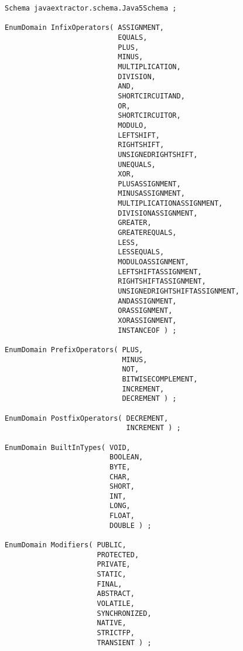 \begin{lstlisting}[caption=Das im Javaextraktor eingesetzte Schema, label=schema_complete, captionpos=b, style=tgschema]
Schema javaextractor.schema.Java5Schema ;

EnumDomain InfixOperators( ASSIGNMENT,
                           EQUALS,
                           PLUS,
                           MINUS,
                           MULTIPLICATION,
                           DIVISION,
                           AND,
                           SHORTCIRCUITAND,
                           OR,
                           SHORTCIRCUITOR,
                           MODULO,
                           LEFTSHIFT,
                           RIGHTSHIFT,
                           UNSIGNEDRIGHTSHIFT,
                           UNEQUALS,
                           XOR,
                           PLUSASSIGNMENT,
                           MINUSASSIGNMENT,
                           MULTIPLICATIONASSIGNMENT,
                           DIVISIONASSIGNMENT,
                           GREATER,
                           GREATEREQUALS, 
                           LESS,
                           LESSEQUALS,
                           MODULOASSIGNMENT,
                           LEFTSHIFTASSIGNMENT,
                           RIGHTSHIFTASSIGNMENT,
                           UNSIGNEDRIGHTSHIFTASSIGNMENT,
                           ANDASSIGNMENT,
                           ORASSIGNMENT,
                           XORASSIGNMENT,
                           INSTANCEOF ) ;

EnumDomain PrefixOperators( PLUS,
                            MINUS,
                            NOT,
                            BITWISECOMPLEMENT,
                            INCREMENT,
                            DECREMENT ) ; 

EnumDomain PostfixOperators( DECREMENT,
                             INCREMENT ) ;

EnumDomain BuiltInTypes( VOID,
                         BOOLEAN,
                         BYTE,
                         CHAR,
                         SHORT,
                         INT,
                         LONG,
                         FLOAT,
                         DOUBLE ) ;

EnumDomain Modifiers( PUBLIC,
                      PROTECTED,
                      PRIVATE,
                      STATIC,
                      FINAL,
                      ABSTRACT,
                      VOLATILE,
                      SYNCHRONIZED,
                      NATIVE,
                      STRICTFP,
                      TRANSIENT ) ;


\end{lstlisting}
